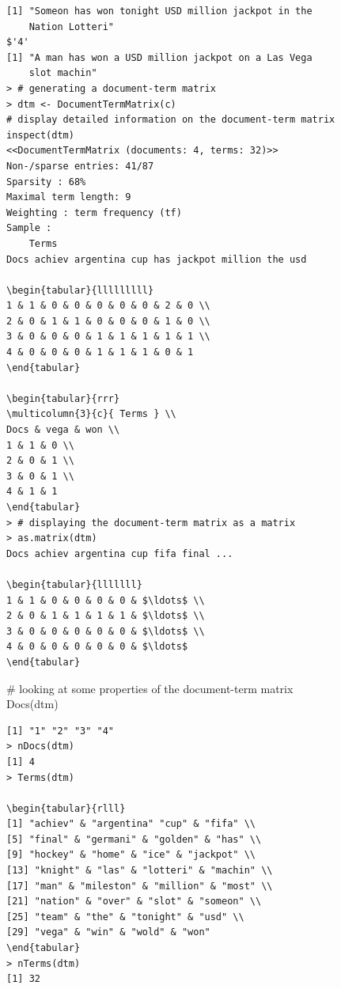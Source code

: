 \documentclass[10pt]{book}
\begin{document}
\begin{verbatim}
[1] "Someon has won tonight USD million jackpot in the
    Nation Lotteri"
$'4'
[1] "A man has won a USD million jackpot on a Las Vega
    slot machin"
> # generating a document-term matrix
> dtm <- DocumentTermMatrix(c)
# display detailed information on the document-term matrix
inspect(dtm)
<<DocumentTermMatrix (documents: 4, terms: 32)>>
Non-/sparse entries: 41/87
Sparsity : 68%
Maximal term length: 9
Weighting : term frequency (tf)
Sample :
    Terms
Docs achiev argentina cup has jackpot million the usd

\begin{tabular}{lllllllll}
1 & 1 & 0 & 0 & 0 & 0 & 0 & 2 & 0 \\
2 & 0 & 1 & 1 & 0 & 0 & 0 & 1 & 0 \\
3 & 0 & 0 & 0 & 1 & 1 & 1 & 1 & 1 \\
4 & 0 & 0 & 0 & 1 & 1 & 1 & 0 & 1
\end{tabular}

\begin{tabular}{rrr}
\multicolumn{3}{c}{ Terms } \\
Docs & vega & won \\
1 & 1 & 0 \\
2 & 0 & 1 \\
3 & 0 & 1 \\
4 & 1 & 1
\end{tabular}
> # displaying the document-term matrix as a matrix
> as.matrix(dtm)
Docs achiev argentina cup fifa final ...

\begin{tabular}{lllllll}
1 & 1 & 0 & 0 & 0 & 0 & $\ldots$ \\
2 & 0 & 1 & 1 & 1 & 1 & $\ldots$ \\
3 & 0 & 0 & 0 & 0 & 0 & $\ldots$ \\
4 & 0 & 0 & 0 & 0 & 0 & $\ldots$
\end{tabular}
\end{verbatim}

\begin{displayquote}
\# looking at some properties of the document-term matrix\\
Docs(dtm)
\end{displayquote}

\begin{verbatim}
[1] "1" "2" "3" "4"
> nDocs(dtm)
[1] 4
> Terms(dtm)

\begin{tabular}{rlll} 
[1] "achiev" & "argentina" "cup" & "fifa" \\
[5] "final" & "germani" & "golden" & "has" \\
[9] "hockey" & "home" & "ice" & "jackpot" \\
[13] "knight" & "las" & "lotteri" & "machin" \\
[17] "man" & "mileston" & "million" & "most" \\
[21] "nation" & "over" & "slot" & "someon" \\
[25] "team" & "the" & "tonight" & "usd" \\
[29] "vega" & "win" & "wold" & "won"
\end{tabular}
> nTerms(dtm)
[1] 32
\end{verbatim}
\end{document}
